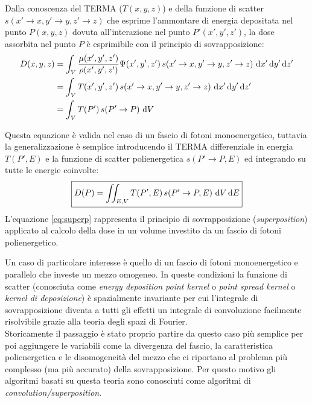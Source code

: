 {Dalla conoscenza del TERMA ($T(x,y,z)$) e della funzione di scatter $s(x'\rightarrow x, y'\rightarrow y, z'\rightarrow z)$ che esprime l'ammontare di energia depositata nel punto $P(x,y,z)$ dovuta all'interazione nel punto $P'(x',y',z')$, la dose assorbita nel punto $P$ è esprimibile con il principio di sovrapposizione:
\begin{align}
D(x,y,z) &=  \int_V \frac{\mu(x',y',z')}{\rho(x',y',z')} \Psi(x',y',z')\,s(x'\rightarrow x, y'\rightarrow y, z'\rightarrow z)\, \,\text{d} x' \,\text{d} y' \,\text{d} z'\\
         &= \int_V T(x',y',z')\,s(x'\rightarrow x, y'\rightarrow y, z'\rightarrow z)\, \,\text{d} x' \,\text{d} y' \,\text{d} z'\\
         &= \int_V T(P')\,s(P'\rightarrow P)\, \,\text{d} V
\end{align}

Questa equazione è valida nel caso di un fascio di fotoni monoenergetico, tuttavia la generalizzazione è semplice introducendo il TERMA differenziale in energia $T(P',E)$ e la funzione di scatter polienergetica $s(P'\rightarrow P,E)$ ed integrando su tutte le energie coinvolte:
\begin{equation}
\boxed{D(P) = \iint_{E,V} T(P',E)\,s(P'\rightarrow P,E)\, \,\text{d} V \,\text{d} E}
\label{eq:superp}
\end{equation}
L'equazione \eqref{eq:superp} rappresenta il principio di sovrapposizione (\textit{superposition}) applicato al calcolo della dose in un volume investito da un fascio di fotoni polienergetico.

Un caso di particolare interesse è quello di un fascio di fotoni monoenergetico e parallelo che investe un mezzo omogeneo. In queste condizioni la funzione di scatter (conosciuta come \textit{energy deposition point kernel} o \textit{point spread kernel} o \textit{kernel di deposizione}) è spazialmente invariante per cui l'integrale di sovrapposizione diventa a tutti gli effetti un integrale di convoluzione facilmente risolvibile grazie alla teoria degli spazi di Fourier.\\
Storicamente il passaggio è stato proprio partire da questo caso più semplice per poi aggiungere le variabili come la divergenza del fascio, la caratteristica polienergetica e le disomogeneità del mezzo che ci riportano al problema più complesso (ma più accurato) della sovrapposizione. Per questo motivo gli algoritmi basati su questa teoria sono conosciuti come algoritmi di \textit{convolution/superposition}.



}
